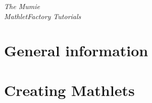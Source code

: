 \documentclass[a4paper,12pt]{book}
\begin{document}
\begin{titlepage}
\begin{center}

\vspace*{1cm}

\huge{\textit{The Mumie\\MathletFactory Tutorials}}

\end{center}
\end{titlepage}

\newpage

\tableofcontents 

\newpage


\chapter{General information}


\chapter{Creating Mathlets}

\end{document}
